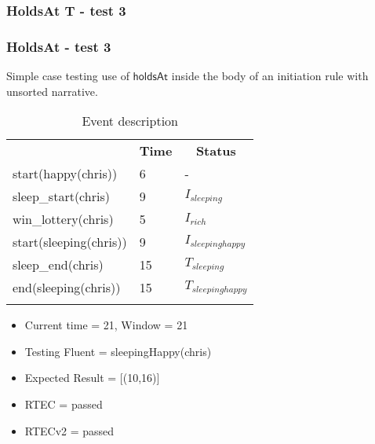 \documentclass[8pt]{beamer}
\def \patsize {}
\def\holdsAt{\textsf{\patsize holdsAt}}
\begin{document}
\begin{frame}
    \frametitle{HoldsAt T - test 3}
    \subsubsection{HoldsAt - test 3}
    \small Simple case testing use of $\holdsAt$ inside the body of an initiation rule with unsorted narrative.\linebreak
    \begin{minipage}{0.48\linewidth}
        \begin{table}[t!]
            \caption{Event description}
            \begin{center}

                \begin{tabular}{lll}
                    \hline\noalign{\smallskip}
                    \multicolumn{1}{l}{\textbf{Event}} & \multicolumn{1}{c}{\textbf{Time}}  & \multicolumn{1}{c}{\textbf{Status}}   \\
                    start(happy(chris)) &6& -\\
                    sleep\_start(chris) &9& $I_{sleeping}$\\
                    win\_lottery(chris) &5& $I_{rich}$\\
                    start(sleeping(chris)) &9& $I_{sleepinghappy}$\\
                    sleep\_end(chris)  &15&$T_{sleeping}$\\
                    end(sleeping(chris)) &15& $T_{sleepinghappy}$\\

                    \noalign{\smallskip}
                    \hline
                \end{tabular}
            \end{center}
        \end{table}
        \begin{itemize}

            \item Current time = 21, Window = 21
            \item Testing Fluent = sleepingHappy(chris)
            \item Expected Result = [(10,16)]
            \item RTEC = passed
            \item RTECv2 = passed
        \end{itemize}
    \end{minipage}
    \begin{minipage}{0.48\linewidth}



\end{minipage}
\end{frame}
\end{document}
